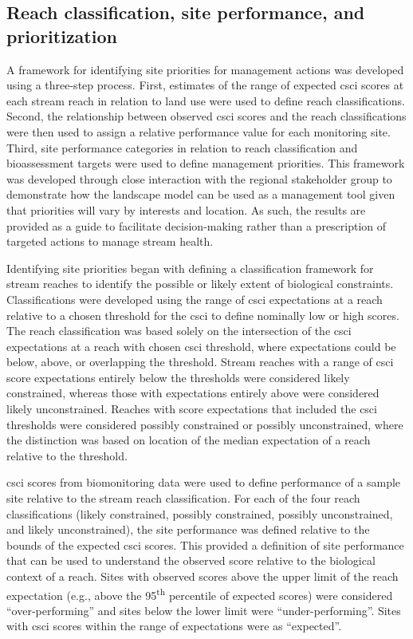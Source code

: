 \documentclass[]{article}
\begin{document}
\subsection{Reach classification, site performance, and
prioritization}\label{reach-classification-site-performance-and-prioritization}

A framework for identifying site priorities for management actions was
developed using a three-step process. First, estimates of the range of
expected \ac{csci} scores at each stream reach in relation to land use
were used to define reach classifications. Second, the relationship
between observed \ac{csci} scores and the reach classifications were
then used to assign a relative performance value for each monitoring
site. Third, site performance categories in relation to reach
classification and bioassessment targets were used to define management
priorities. This framework was developed through close interaction with
the regional stakeholder group to demonstrate how the landscape model
can be used as a management tool given that priorities will vary by
interests and location. As such, the results are provided as a guide to
facilitate decision-making rather than a prescription of targeted
actions to manage stream health.

Identifying site priorities began with defining a classification
framework for stream reaches to identify the possible or likely extent
of biological constraints. Classifications were developed using the
range of \ac{csci} expectations at a reach relative to a chosen
threshold for the \ac{csci} to define nominally low or high scores. The
reach classification was based solely on the intersection of the
\ac{csci} expectations at a reach with chosen \ac{csci} threshold, where
expectations could be below, above, or overlapping the threshold. Stream
reaches with a range of \ac{csci} score expectations entirely below the
thresholds were considered likely constrained, whereas those with
expectations entirely above were considered likely unconstrained.
Reaches with score expectations that included the \ac{csci} thresholds
were considered possibly constrained or possibly unconstrained, where
the distinction was based on location of the median expectation of a
reach relative to the threshold.

\ac{csci} scores from biomonitoring data were used to define performance
of a sample site relative to the stream reach classification. For each
of the four reach classifications (likely constrained, possibly
constrained, possibly unconstrained, and likely unconstrained), the site
performance was defined relative to the bounds of the expected \ac{csci}
scores. This provided a definition of site performance that can be used
to understand the observed score relative to the biological context of a
reach. Sites with observed scores above the upper limit of the reach
expectation (e.g., above the 95\textsuperscript{th} percentile of
expected scores) were considered ``over-performing'' and sites below the
lower limit were ``under-performing''. Sites with \ac{csci} scores
within the range of expectations were as ``expected''.
\end{document}
